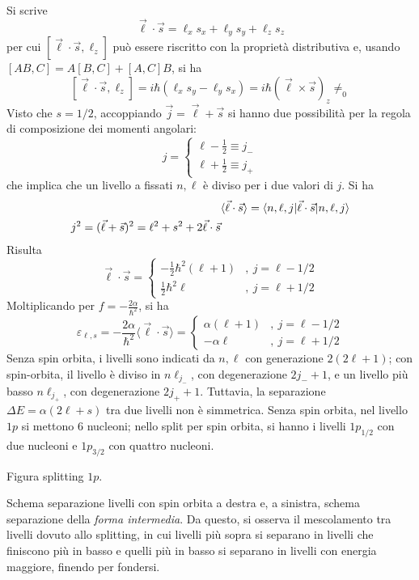 \documentclass[11pt, a4paper]{scrartcl}
\theoremstyle{style}
\newenvironment{boxenv}[1][]{
    \begin{eqbox}[#1]
    }{
   \end{eqbox}
}
\numberwithin{equation}{subsection}
\begin{document}
Si scrive
\[
\vec{\ell }\cdot \vec{s} = \ell _x s_x + \ell _ys_y + \ell _zs_z
\] 
per cui $[\vec{\ell }\cdot \vec{s},\ell _z]$ pu\`o essere riscritto con la propriet\`a distributiva e, usando $[AB,C] = A[B,C ] + [A,C]B$, si ha
\[
	[\vec{\ell }\cdot \vec{s},\ell _z]= i\hbar (\ell _xs _y - \ell _ys_x ) = i\hbar (\vec{\ell }\times \vec{s})_z \neq_0
\] 
Visto che $s = 1 / 2$, accoppiando $\vec{j} = \vec{\ell } + \vec{s}$ si hanno due possibilit\`a per la regola di composizione dei momenti angolari:
\[
j = \begin{cases}
	\ell  - \frac{1}{2} \equiv j_-\\
	\ell +\frac{1}{2} \equiv j_+
\end{cases}
\] 
che implica che un livello a fissati $n,\ell $ \`e diviso per i due valori di $j$.
Si ha 
\[
	\begin{split}
		&\langle \vec{\ell }\cdot \vec{s} \rangle = \braket{n,\ell ,j|\vec{\ell }\cdot \vec{s}|n,\ell ,j} \\
		j^2 = (\vec{\ell }+\vec{s})^2 = \ell ^2 + s^2 + 2 \vec{\ell }\cdot \vec{s}
	\end{split}
\] 
Risulta
\[
\vec{\ell }\cdot \vec{s} = \begin{cases}
	-\frac{1}{2} \hbar ^2 (\ell +1) &,\ j = \ell  - 1 / 2\\
	\frac{1}{2} \hbar ^2 \ell &,\ j = \ell  + 1/2
\end{cases}
\] 
Moltiplicando per $f = -\frac{2 \alpha  }{ \hbar ^2}$, si ha 
\[
\varepsilon _{\ell ,s} = - \frac{2\alpha }{\hbar ^2} \langle \vec{\ell }\cdot \vec{s} \rangle = \begin{cases}
	\alpha  (\ell +1) &,\ j = \ell  - 1  / 2\\
	-\alpha \ell  &,\ j = \ell + 1 /2
\end{cases}
\] 
Senza spin orbita, i livelli sono indicati da $n,\ell $ con generazione $2(2\ell +1)$; con spin-orbita, il livello \`e diviso in $n \ell _{j_-}$, con degenerazione $2j_- + 1$, e un livello pi\`u basso $n\ell _{j_+}$, con degenerazione $2j_+ +1$.
Tuttavia, la separazione $\Delta E = \alpha (2\ell +s)$ tra due livelli non \`e simmetrica.
Senza spin orbita, nel livello $1 p $ si mettono $6$ nucleoni; nello split per spin orbita, si hanno i livelli $1 p_{1 / 2}$ con due nucleoni e $1 p_{3 / 2}$ con quattro nucleoni.
\begin{boxenv}[]
Figura splitting $1p$.
\end{boxenv}
\begin{boxenv}[]
Schema separazione livelli con spin orbita a destra e, a sinistra, schema separazione della \textit{forma intermedia}.
Da questo, si osserva il mescolamento tra livelli dovuto allo splitting, in cui livelli pi\`u sopra si separano in livelli che finiscono pi\`u in basso e quelli pi\`u in basso si separano in livelli con energia maggiore, finendo per fondersi.
\end{boxenv}
\end{document}
